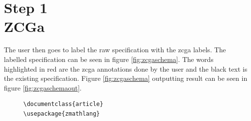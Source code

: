 \section{Step 1\\ZCGa}

The user then goes to label the raw specification with the \gls{zcga} labels.
The labelled specification can be seen in figure \ref{fig:zcgaschema}. The words
highlighted in {\color{red}red} are the \gls{zcga} annotations done by the user
and the black text is the existing specification. Figure \ref{fig:zcgaschema}
outputting result can be seen in figure \ref{fig:zcgaschemaout}.

\begin{figure}[H]
\centering
\begin{minipage}{0.45\textwidth}
\centering
\begin{tiny}
\begin{BVerbatim}[commandchars=+\[\]]
\documentclass{article}
\usepackage{zmathlang}


\end{BVerbatim}
\end{tiny}
\end{minipage}
\end{figure}

